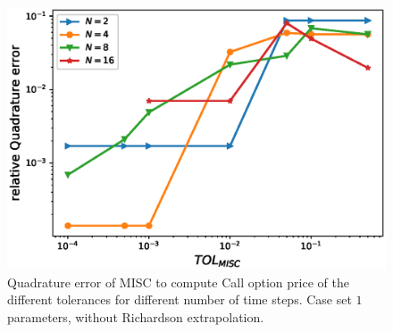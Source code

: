 \documentclass[11pt]{article}
\begin{document}
\begin{figure}[h!]
	\centering
	\includegraphics[width=0.7\linewidth]{./figures/rBergomi_MISC_quadratre_error/vs_TOL/set1/relative_quad_error_wrt_MISC_TOL_set1_non_rich}
	
	
	\caption{Quadrature error of MISC to compute Call option price of the different tolerances for different number of time steps. Case  set $1$ parameters, without Richardson extrapolation.}
	\label{fig:Quadrature_error_set1}
\end{figure}
\end{document}
